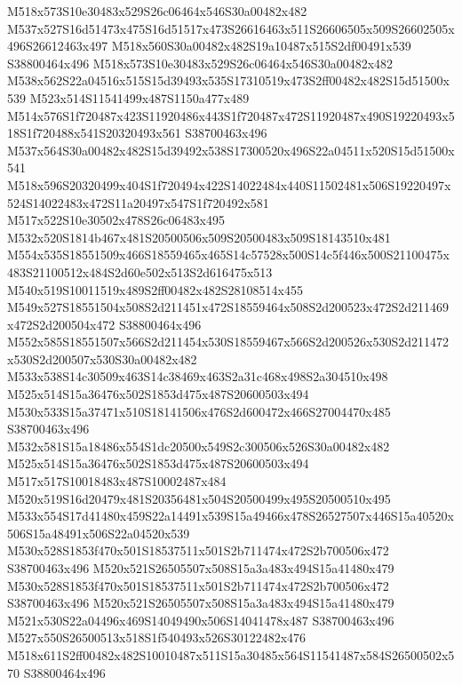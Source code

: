 \documentclass{article}
\begin{document}
\begin{multicols}{2}
M518x573S10e30483x529S26c06464x546S30a00482x482 M537x527S16d51473x475S16d51517x473S26616463x511S26606505x509S26602505x496S26612463x497 M518x560S30a00482x482S19a10487x515S2df00491x539 S38800464x496 M518x573S10e30483x529S26c06464x546S30a00482x482 M538x562S22a04516x515S15d39493x535S17310519x473S2ff00482x482S15d51500x539 M523x514S11541499x487S1150a477x489 M514x576S1f720487x423S11920486x443S1f720487x472S11920487x490S19220493x518S1f720488x541S20320493x561 S38700463x496 M537x564S30a00482x482S15d39492x538S17300520x496S22a04511x520S15d51500x541 M518x596S20320499x404S1f720494x422S14022484x440S11502481x506S19220497x524S14022483x472S11a20497x547S1f720492x581 M517x522S10e30502x478S26c06483x495 M532x520S1814b467x481S20500506x509S20500483x509S18143510x481 M554x535S18551509x466S18559465x465S14c57528x500S14c5f446x500S21100475x483S21100512x484S2d60e502x513S2d616475x513 M540x519S10011519x489S2ff00482x482S28108514x455 M549x527S18551504x508S2d211451x472S18559464x508S2d200523x472S2d211469x472S2d200504x472 S38800464x496 M552x585S18551507x566S2d211454x530S18559467x566S2d200526x530S2d211472x530S2d200507x530S30a00482x482 M533x538S14c30509x463S14c38469x463S2a31c468x498S2a304510x498 M525x514S15a36476x502S1853d475x487S20600503x494 M530x533S15a37471x510S18141506x476S2d600472x466S27004470x485 S38700463x496 M532x581S15a18486x554S1dc20500x549S2c300506x526S30a00482x482 M525x514S15a36476x502S1853d475x487S20600503x494 M517x517S10018483x487S10002487x484 M520x519S16d20479x481S20356481x504S20500499x495S20500510x495 M533x554S17d41480x459S22a14491x539S15a49466x478S26527507x446S15a40520x506S15a48491x506S22a04520x539 M530x528S1853f470x501S18537511x501S2b711474x472S2b700506x472 S38700463x496 M520x521S26505507x508S15a3a483x494S15a41480x479 M530x528S1853f470x501S18537511x501S2b711474x472S2b700506x472 S38700463x496 M520x521S26505507x508S15a3a483x494S15a41480x479 M521x530S22a04496x469S14049490x506S14041478x487 S38700463x496 M527x550S26500513x518S1f540493x526S30122482x476 M518x611S2ff00482x482S10010487x511S15a30485x564S11541487x584S26500502x570 S38800464x496




\end{multicols}
\end{document}
